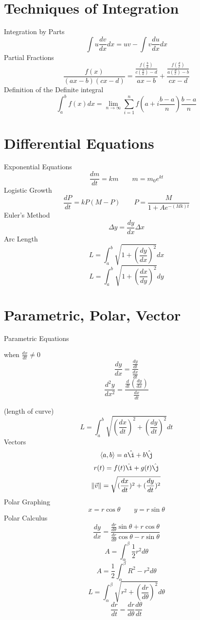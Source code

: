 \documentclass[letter]{article}
\begin{document}
\begin{multicols}{2}
\vspace{2cm}
\section{Techniques of Integration}
Integration by Parts
\[\int u \frac{dv}{dx}dx = uv - \int v \frac{du}{dx}dx\]
Partial Fractions
\[\frac{f(x)}{(ax - b)(cx - d)} = \frac{\frac{f(\frac{b}{a})}{c(\frac{b}{a}) - d}}{ax-b}+\frac{\frac{f(\frac{d}{c})}{a(\frac{d}{c}) - b}}{cx - d}\]
Definition of the Definite integral
\[\int_{a}^{b}f(x)dx = \lim\limits_{n\to\infty}\sum_{i=1}^{n}f(a+i\frac{b-a}{n})\frac{b-a}{n}\]
\section{Differential Equations}
Exponential Equations
\[\frac{dm}{dt} = km \qquad m =m_{0}e^{kt}\]
Logistic Growth
\[\frac{dP}{dt} = kP(M-P) \qquad P = \frac{M}{1+Ae^{-(Mk)t}}\]
Euler's Method
\[\Delta y = \frac{dy}{dx} \Delta x\]
Arc Length
\[L = \int_{a}^{b}\sqrt{1+(\frac{dy}{dx})^{2}}dx\]
\[L = \int_{a}^{b}\sqrt{1+(\frac{dx}{dy})^{2}}dy\]
\section{Parametric, Polar, Vector}
Parametric Equations

when $\frac{dx}{dt} \neq 0$
\[\frac{dy}{dx} = \frac{\frac{dy}{dt}}{\frac{dx}{dt}}\]
\[\frac{d^{2}y}{dx^{2}} = \frac{\frac{d}{dt}(\frac{dy}{dx})}{\frac{dx}{dt}}\]

(length of curve)
\[L = \int_{a}^{b}\sqrt{(\frac{dx}{dt})^{2}+(\frac{dy}{dt})^{2}}dt\]
Vectors
\[\langle a , b \rangle = a\hat{\i} + b\hat{\j}\]
\[r(t) = f(t)\hat{\i} + g(t)\hat{\j}\]
\[\norm{\vec{v}} = \sqrt{(\frac{dx}{dt})^{2}+(\frac{dy}{dt})^{2}}\]
Polar Graphing
\[x = r\cos\theta \qquad y = r \sin\theta\]
Polar Calculus
\[\frac{dy}{dx}=\frac{\frac{dr}{d\theta}\sin\theta + r \cos\theta}{\frac{dr}{d\theta}\cos\theta - r\sin\theta}\]
\[A = \int_{\alpha}^{\beta}\frac{1}{2}r^{2}d\theta\]
\[A = \frac{1}{2}\int_{\alpha}^{\beta}R^{2} - r^{2}d\theta\]
\[L = \int_{\alpha}^{\beta}\sqrt{r^{2}+(\frac{dr}{d\theta})^{2}}d\theta\]
\[\frac{dr}{dt} = \frac{dr}{d\theta}\frac{d\theta}{dt}\]
\end{multicols}
\end{document}
